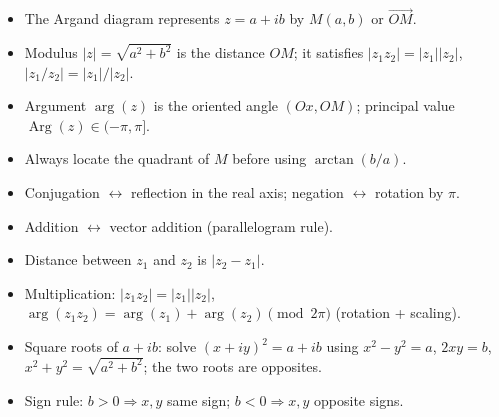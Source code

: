 \documentclass[11pt]{article}
\begin{document}
\begin{aretenir}
\begin{itemize}
    \item The Argand diagram represents $z = a+ib$ by $M(a,b)$ or $\overrightarrow{OM}$.
    \item Modulus $|z| = \sqrt{a^2+b^2}$ is the distance $OM$; it satisfies $|z_1z_2| = |z_1||z_2|$, $|z_1/z_2| = |z_1|/|z_2|$.
    \item Argument $\arg(z)$ is the oriented angle $(Ox, OM)$; principal value $\operatorname{Arg}(z) \in (-\pi,\pi]$.
    \item Always locate the quadrant of $M$ before using $\arctan(b/a)$.
    \item Conjugation $\leftrightarrow$ reflection in the real axis; negation $\leftrightarrow$ rotation by $\pi$.
    \item Addition $\leftrightarrow$ vector addition (parallelogram rule).
    \item Distance between $z_1$ and $z_2$ is $|z_2 - z_1|$.
    \item Multiplication: $|z_1z_2| = |z_1||z_2|$, $\arg(z_1z_2) = \arg(z_1) + \arg(z_2) \pmod{2\pi}$ (rotation + scaling).
    \item Square roots of $a+ib$: solve $(x+iy)^2 = a+ib$ using $x^2-y^2=a$, $2xy=b$, $x^2+y^2=\sqrt{a^2+b^2}$; the two roots are opposites.
    \item Sign rule: $b>0 \Rightarrow x,y$ same sign; $b<0 \Rightarrow x,y$ opposite signs.
\end{itemize}
\end{aretenir}
\end{document}
